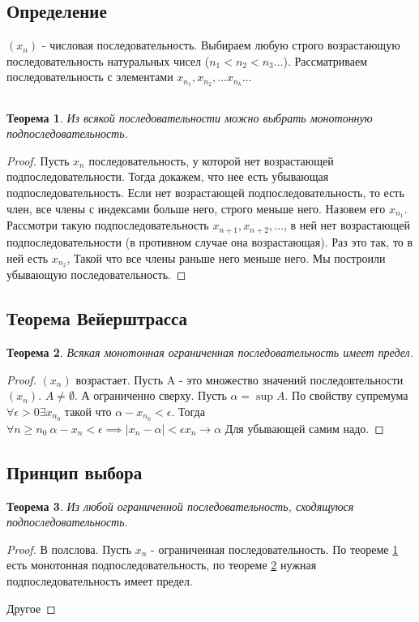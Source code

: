 \documentclass[a4paper]{article}
\newtheorem{theorem}{Теорема}
\begin{document}
\subsection{Определение}
$(x_n)$ - числовая последовательность. Выбираем любую строго возрастающую последовательность натуральных чисел ($n_1 < n_2  < n_3 \dots $). Рассматриваем последовательность с элементами $x_{n_1}, x_{n_2}, \dots x_{n_{k}} \dots$
\subsection{}
\begin{theorem} \label{1}
	Из всякой последовательности можно выбрать монотонную подпоследовательность.
\end{theorem}
\begin{proof}

	Пусть $x_n$ последовательность, у которой нет возрастающей подпоследовательности. Тогда
	докажем, что нее есть убывающая подпоследовательность. Если нет возрастающей подпоследовательность, то
	есть член, все члены с индексами больше него, строго меньше него. Назовем его $x_{n_1}$.
	Рассмотри такую подпоследовательность $x_{n +1} , x_{n + 2},\dots$, в ней нет возрастающей подпоследовательности (в противном случае она возрастающая). Раз это так, то в ней есть  $x_{n_2}$, Такой что все члены раньше него меньше него. Мы построили убывающую последовательность.
\end{proof}
\subsection{Теорема Вейерштрасса}
\begin{theorem} \label{weir}
	Всякая монотонная ограниченная последовательность имеет предел.
\end{theorem}
\begin{proof}
	$(x_n)$ возрастает. Пусть A - это множество значений последовтельности  $(x_n)$. $A \neq \emptyset$.
	А ограниченно сверху. Пусть $\alpha = \sup{A}$. По свойству супремума  $\forall \epsilon > 0 \exists x_{n_0}$ такой что $\alpha - x_{n_0} < \epsilon$. Тогда  $\forall  n\ge n_0 ~ \alpha -x_{n} < \epsilon \implies \mid x_n -\alpha \mid < \epsilon x_n \to \alpha$
	Для убывающей самим надо.
\end{proof}
\subsection{Принцип выбора}
\begin{theorem}
	Из любой ограниченной последовательность, сходящуюся подпоследовательность.
\end{theorem}
\begin{proof}
	В полслова. Пусть $x_n$ - ограниченная последовательность. По теореме \ref{1} есть монотонная подпоследовательность, по теореме \ref{weir} нужная подпоследовательность имеет предел.

	Другое
\end{proof}
\end{document}
